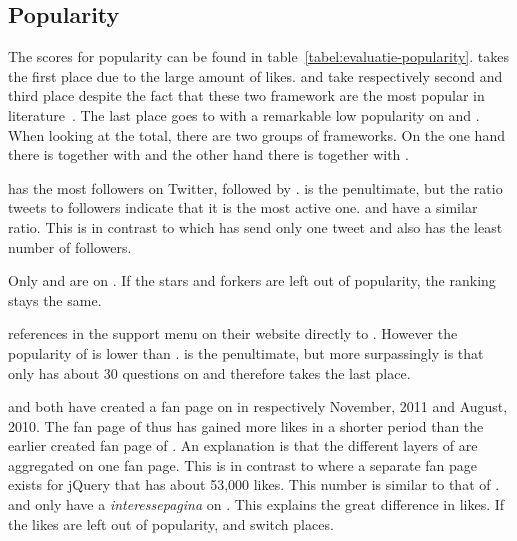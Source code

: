 \documentclass[a4paper]{artikel3}
\newcommand{\term}[1]{\emph{#1}}
\begin{document}

\subsection{Popularity} %
\label{sec:evaluation-popularity}


The scores for popularity can be found in table~\ref{tabel:evaluatie-popularity}. 
\kendo{} takes the first place due to the large amount of \fb{} likes.
\jqm{} and \st{} take respectively second and third place despite the fact that these two framework are the most popular in literature~\cite{David2011,Firtman2013,Hales2012,Oeflman2011}. 
The last place goes to \lungo{} with a remarkable low popularity on \so{} and \fb.
When looking at the total, there are two groups of frameworks.
On the one hand there is \kendo{} together with \jqm{} and the other hand there is \st{} together with \lungo{}.

\jqm{} has the most followers on Twitter, followed by \kendo.
\lungo{} is the penultimate, but the ratio tweets to followers indicate that it is the most active one. 
\jqm{} and \kendo{} have a similar ratio.
This is in contrast to \st{} which has send only one tweet and also has the least number of followers. 

Only \jqm{} and \lungo{} are on \gh{}. 
If the \gh{} stars and \gh{} forkers are left out of popularity, the ranking stays the same.

\kendo{} references in the support menu on their website directly to \so{}. 
However the popularity of \kendo{} is lower than \jqm{}.
\st{} is the penultimate, but more surpassingly is that \lungo{} only has about 30 questions on \so{} and therefore takes the last place.

\kendo{} and \jqm{} both have created a fan page on \fb{} in respectively November, 2011 and August, 2010.
The fan page of \kendo{} thus has gained more \fb{} likes in a shorter period than the earlier created fan page of \jqm{}.
An explanation is that the different layers of \kendo{} are aggregated on one fan page.
This is in contrast to \jqm{} where a separate fan page exists for jQuery that has about 53,000 likes.
This number is similar to that of \kendo{}.
\st{} and \lungo{} only have a \term{interessepagina} on \fb.
This explains the great difference in \fb{} likes.
If the likes are left out of popularity, \kendo{} and \jqm{} switch places.
\end{document}
